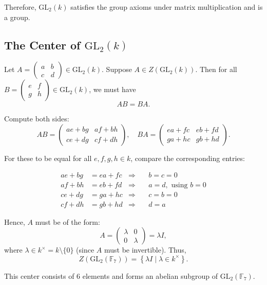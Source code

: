 \documentclass[12pt]{article}
\begin{document}
Therefore, \( \mathrm{GL}_2(k) \) satisfies the group axioms under matrix multiplication and is a group.

\subsection*{The Center of \(\mathrm{GL}_2(k)\)}

Let \( A = \begin{pmatrix} a & b \\ c & d \end{pmatrix} \in \mathrm{GL}_2(k) \). Suppose \( A \in Z(\mathrm{GL}_2(k)) \). Then for all \( B = \begin{pmatrix} e & f \\ g & h \end{pmatrix} \in \mathrm{GL}_2(k) \), we must have
\[
AB = BA.
\]

Compute both sides:
\[
AB = \begin{pmatrix} ae + bg & af + bh \\ ce + dg & cf + dh \end{pmatrix}, \quad
BA = \begin{pmatrix} ea + fc & eb + fd \\ ga + hc & gb + hd \end{pmatrix}.
\]

For these to be equal for all \( e, f, g, h \in k \), compare the corresponding entries:

\begin{align*}
ae + bg &= ea + fc &\Rightarrow& \quad b = c = 0 \\
af + bh &= eb + fd &\Rightarrow& \quad a = d, \text{ using } b = 0 \\
ce + dg &= ga + hc &\Rightarrow& \quad c = b = 0 \\
cf + dh &= gb + hd &\Rightarrow& \quad d = a
\end{align*}

Hence, \( A \) must be of the form:
\[
A = \begin{pmatrix} \lambda & 0 \\ 0 & \lambda \end{pmatrix} = \lambda I,
\]
where \( \lambda \in k^\times = k \setminus \{0\} \) (since \( A \) must be invertible). Thus,
\[
Z(\mathrm{GL}_2(\mathbb{F}_7)) = \left\{ \lambda I \mid \lambda \in k^\times \right\}.
\]

This center consists of 6 elements and forms an abelian subgroup of \( \mathrm{GL}_2(\mathbb{F}_7) \).
\end{document}
